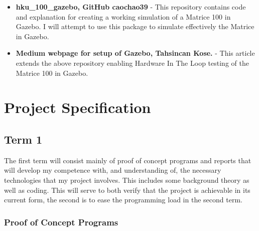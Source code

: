 \documentclass[]{final_report}
\begin{document}
\begin{itemize}
  \item \textbf{hku\_100\_gazebo, GitHub caochao39} \cite{caochao39} - This repository contains code and explanation for creating a working simulation of a Matrice 100 in Gazebo. I will attempt to use this package to simulate effectively the Matrice in Gazebo.
  \item \textbf{Medium webpage for setup of Gazebo, Tahsincan Kose.} \cite{kose_2019} - This article extends the above repository enabling Hardware In The Loop testing of the Matrice 100 in Gazebo.
\end{itemize}




\chapter{Project Specification}

\section{Term 1}

The first term will consist mainly of proof of concept programs and reports that will develop my competence with, and understanding of, the necessary technologies that my project involves. This includes some background theory as well as coding. This will serve to both verify that the project is achievable in its current form, the second is to ease the programming load in the second term.

\subsection{Proof of Concept Programs}
\end{document}
